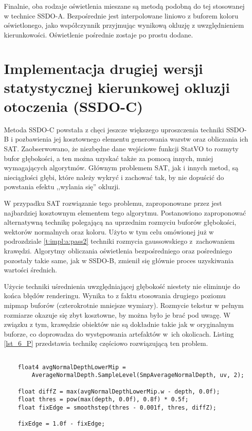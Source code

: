 		Finalnie, oba rodzaje oświetlenia mieszane są metodą podobną do tej stosowanej w technice SSDO-A. Bezpośrednie jest interpolowane liniowo z buforem koloru oświetlonego, jako współczynnik przyjmując wynikową okluzję z uwzględnieniem kierunkowości. Oświetlenie pośrednie zostaje po prostu dodane.

	\section{Implementacja drugiej wersji statystycznej kierunkowej okluzji otoczenia (SSDO-C)}
	\label{t:impl:c}
	
	
	
	Metoda SSDO-C powstała z chęci jeszcze większego uproszczenia techniki SSDO-B i pozbawienia jej kosztownego elementu generowania warstw oraz obliczania ich SAT. Zaobserwowano, że niezbędne dane wejściowe funkcji StatVO to rozmyty bufor głębokości, a ten można uzyskać także za pomocą innych, mniej wymagających algorytmów. Głównym problemem SAT, jak i innych metod, są nieciągłości głębi, które należy wykryć i zachować tak, by nie dopuścić do powstania efektu ,,wylania się'' okluzji. 
	
	W przypadku SAT rozwiązanie tego problemu, zaproponowane przez \cite{statvo} jest najbardziej kosztownym elementem tego algorytmu. Postanowiono zaproponować alternatywną technikę polegającą na uprzednim rozmyciu buforów głębokości, wektorów normalnych oraz koloru. Użyto w tym celu omówionej już w podrozdziale \ref{t:impl:a:pass2} techniki rozmycia gaussowskiego z~zachowaniem krawędzi. Algorytmy obliczania oświetlenia bezpośredniego oraz pośredniego pozostały takie same, jak w SSDO-B, zmienił się głównie proces uzyskiwania wartości średnich.
	
	Użycie techniki uśrednienia uwzględniającej głębokość niestety nie eliminuje do końca błędów renderingu. Wynika to z faktu stosowania drugiego poziomu mipmap buforów (czterokrotnie mniejsze wymiary). Rozmycie tekstur w pełnym rozmiarze okazuje się zbyt kosztowne, by można było je brać pod uwagę. W związku z tym, krawędzie obiektów nie są dokładnie takie jak w oryginalnym buforze, co doprowadza do występowania artefaktów w~ich okolicach. Listing \ref{lst_6_P} przedstawia technikę częściowo rozwiązującą ten problem.\pagebreak
	
	\begin{lstlisting}[language=HLSL,caption={Naprawa artefaktu występującego w okolicach krawędzi w technice SSDO-C.},label={lst_6_P}]
	
	float4 avgNormalDepthLowerMip = 
		AverageNormalDepth.SampleLevel(SmpAverageNormalDepth, uv, 2);
	
	float diffZ = max(avgNormalDepthLowerMip.w - depth, 0.0f);
	float thres = pow(max(depth, 0.0f), 0.8f) * 0.5f;
	float fixEdge = smoothstep(thres - 0.001f, thres, diffZ);
	
	fixEdge = 1.0f - fixEdge;
	
	\end{lstlisting}
	

